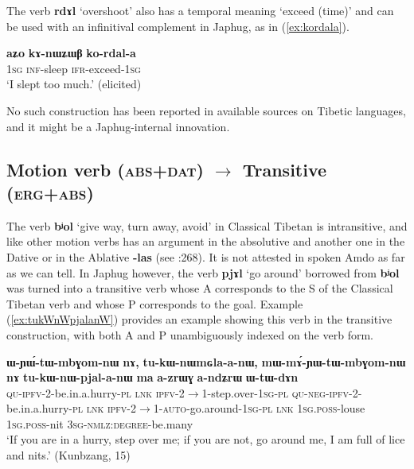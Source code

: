 \documentclass[oneside,a4paper,11pt]{article}
\newcommand{\ipa}[1]{{\phon\textbf{\mbox{#1}}}} %
\newcommand{\refb}[1]{(\ref{#1})}
\begin{document}
The verb \ipa{rdɤl} `overshoot' also has a temporal meaning `exceed (time)' and can be used with an infinitival complement in Japhug, as in \refb{ex:kordala}.

\begin{exe}
\ex \label{ex:kordala}
\gll
\ipa{aʑo}  	\ipa{kɤ-nɯʑɯβ}  	\ipa{ko-rdal-a}  \\
\textsc{1sg} \textsc{inf}-sleep \textsc{ifr}-exceed-\textsc{1sg} \\
\glt `I slept too much.' (elicited)
\end{exe}

No such construction has been reported in available sources on Tibetic languages, and it might be a Japhug-internal innovation.

\subsection{Motion verb (\textsc{abs+dat}) $\rightarrow$ Transitive (\textsc{erg+abs})}  
The verb \ipa{bʲol} `give way, turn away, avoid' in Classical Tibetan is intransitive, and like other motion verbs has an argument in the absolutive and another one in the Dative or in the Ablative \ipa{-las} (see \citealt{hill10dictionary}:268). It is not attested in spoken Amdo as far as we can tell. In Japhug however, the verb \ipa{pjɤl} `go around' borrowed from  \ipa{bʲol} was turned into a transitive verb whose A corresponds to the S of the Classical Tibetan verb and whose P corresponds to the goal. Example \refb{ex:tukWnWpjalanW} provides an example  showing this verb in the transitive construction, with both A and P unambiguously indexed on the verb form.


\begin{exe}
\ex \label{ex:tukWnWpjalanW}
\gll
\ipa{ɯ-ɲɯ́-tɯ-mbɣom-nɯ}  	\ipa{nɤ,}  	\ipa{tu-kɯ-nɯmɢla-a-nɯ,}  \ipa{mɯ-mɤ́-ɲɯ-tɯ-mbɣom-nɯ}  	\ipa{nɤ}  	\ipa{tu-kɯ-nɯ-pjal-a-nɯ}  	\ipa{ma}  	\ipa{a-zrɯɣ}  	\ipa{a-ndʑrɯ}  	\ipa{ɯ-tɯ-dɤn} \\
\textsc{qu-ipfv}-2-be.in.a.hurry-\textsc{pl} \textsc{lnk} \textsc{ipfv}-2$\rightarrow$1-step.over-\textsc{1sg-pl} \textsc{qu-neg-ipfv}-2-be.in.a.hurry-\textsc{pl} \textsc{lnk} \textsc{ipfv}-2$\rightarrow$1-\textsc{auto}-go.around-\textsc{1sg-pl} \textsc{lnk}   \textsc{1sg.poss}-louse \textsc{1sg.poss}-nit \textsc{3sg-nmlz:degree}-be.many \\
\glt `If you are in a hurry, step over me; if you are not, go around me, I am full of lice and nits.' (Kunbzang, 15)
\end{exe}
\end{document}
